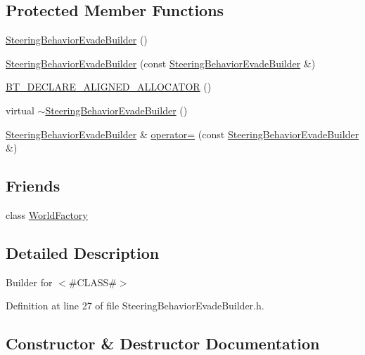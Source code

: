 \subsection*{Protected Member Functions}
\begin{DoxyCompactItemize}
\item 
\mbox{\hyperlink{classnjli_1_1_steering_behavior_evade_builder_afb2516f8ffad2569836b838d7b9a1ca7}{Steering\+Behavior\+Evade\+Builder}} ()
\item 
\mbox{\hyperlink{classnjli_1_1_steering_behavior_evade_builder_aba75b6ee3daf82833edea293db4c94bf}{Steering\+Behavior\+Evade\+Builder}} (const \mbox{\hyperlink{classnjli_1_1_steering_behavior_evade_builder}{Steering\+Behavior\+Evade\+Builder}} \&)
\item 
\mbox{\hyperlink{classnjli_1_1_steering_behavior_evade_builder_a13120a9517352f0ce8c208e196026d42}{B\+T\+\_\+\+D\+E\+C\+L\+A\+R\+E\+\_\+\+A\+L\+I\+G\+N\+E\+D\+\_\+\+A\+L\+L\+O\+C\+A\+T\+OR}} ()
\item 
virtual \mbox{\hyperlink{classnjli_1_1_steering_behavior_evade_builder_a37b255513f0d7fa7c4746b9c448e97af}{$\sim$\+Steering\+Behavior\+Evade\+Builder}} ()
\item 
\mbox{\hyperlink{classnjli_1_1_steering_behavior_evade_builder}{Steering\+Behavior\+Evade\+Builder}} \& \mbox{\hyperlink{classnjli_1_1_steering_behavior_evade_builder_a034d25bc4216ee1fce30eae6e1d09637}{operator=}} (const \mbox{\hyperlink{classnjli_1_1_steering_behavior_evade_builder}{Steering\+Behavior\+Evade\+Builder}} \&)
\end{DoxyCompactItemize}
\subsection*{Friends}
\begin{DoxyCompactItemize}
\item 
class \mbox{\hyperlink{classnjli_1_1_steering_behavior_evade_builder_acb96ebb09abe8f2a37a915a842babfac}{World\+Factory}}
\end{DoxyCompactItemize}


\subsection{Detailed Description}
Builder for $<$\#\+C\+L\+A\+SS\#$>$ 

Definition at line 27 of file Steering\+Behavior\+Evade\+Builder.\+h.



\subsection{Constructor \& Destructor Documentation}
\mbox{\label{classnjli_1_1_steering_behavior_evade_builder_afb2516f8ffad2569836b838d7b9a1ca7}} 
